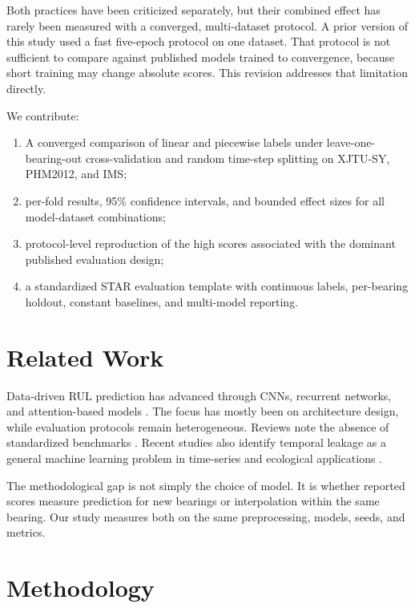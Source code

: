 \documentclass[5p,twocolumn]{elsarticle}
\begin{document}
Both practices have been criticized separately, but their combined effect has rarely been measured with a converged, multi-dataset protocol. A prior version of this study used a fast five-epoch protocol on one dataset. That protocol is not sufficient to compare against published models trained to convergence, because short training may change absolute scores. This revision addresses that limitation directly.

We contribute:
\begin{enumerate}
    \item A converged comparison of linear and piecewise labels under leave-one-bearing-out cross-validation and random time-step splitting on XJTU-SY, PHM2012, and IMS;
    \item per-fold results, 95\% confidence intervals, and bounded effect sizes for all model-dataset combinations;
    \item protocol-level reproduction of the high scores associated with the dominant published evaluation design;
    \item a standardized STAR evaluation template with continuous labels, per-bearing holdout, constant baselines, and multi-model reporting.
\end{enumerate}

\section{Related Work}
Data-driven RUL prediction has advanced through CNNs, recurrent networks, and attention-based models \cite{li2020multiscale,zhang2020lstm,mo2022transformer}. The focus has mostly been on architecture design, while evaluation protocols remain heterogeneous. Reviews note the absence of standardized benchmarks \cite{zhao2021deep,caesarendra2021machine}. Recent studies also identify temporal leakage as a general machine learning problem in time-series and ecological applications \cite{leakage_nature,leakage_frontiers}.

The methodological gap is not simply the choice of model. It is whether reported scores measure prediction for new bearings or interpolation within the same bearing. Our study measures both on the same preprocessing, models, seeds, and metrics.

\section{Methodology}
\end{document}
